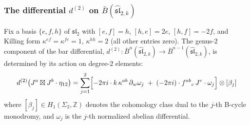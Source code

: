 \subsubsection{\texorpdfstring{The differential $d^{(2)}$ on $\bar{B}(\widehat{\mathfrak{sl}}_{2,k})$}{The differential d-two on the affine sl2 bar complex}}

\begin{theorem}\label{thm:sl2-genus2-bar-differential}
Fix a basis $\{e, f, h\}$ of $\mathfrak{sl}_2$ with
$[e,f] = h$, $[h,e] = 2e$, $[h,f] = -2f$, and Killing form
$\kappa^{ef} = \kappa^{fe} = 1$, $\kappa^{hh} = 2$
\textup{(}all other entries zero\textup{)}.
The genus-$2$ component of the bar differential,
$d^{(2)}\colon \bar{B}^n(\widehat{\mathfrak{sl}}_{2,k}) \to
\bar{B}^{n-1}(\widehat{\mathfrak{sl}}_{2,k})$, is determined by its
action on degree-$2$ elements:
\begin{equation}\label{eq:sl2-d2-formula}
d^{(2)}\bigl(J^a \boxtimes J^b \cdot \eta_{12}\bigr)
= \sum_{j=1}^{2} \Bigl[
 -2\pi i \cdot k\,\kappa^{ab}\, \partial_w\omega_j
 \;+\; (-2\pi i) \cdot f^{ab}{}_{c}\, J^c \cdot \omega_j
\Bigr] \otimes [\beta_j]
\end{equation}
where $[\beta_j] \in H_1(\Sigma_2, \mathbb{Z})$ denotes the
cohomology class dual to the $j$-th B-cycle monodromy, and
$\omega_j$ is the $j$-th normalized abelian differential.
\end{theorem}

